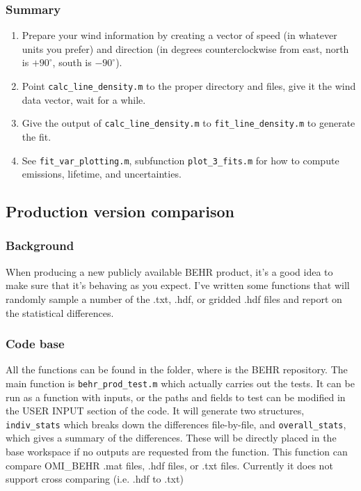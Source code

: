 \documentclass[12pt]{article}
\begin{document}
		\subsubsection{Summary}
		\begin{enumerate}
		\item Prepare your wind information by creating a vector of speed (in whatever units you prefer) and direction (in degrees counterclockwise from east, north is $+90^\circ$, south is $-90^\circ$).
		\item Point \lstinline$calc_line_density.m$ to the proper directory and files, give it the wind data vector, wait for a while.
		\item Give the output of \lstinline$calc_line_density.m$ to \lstinline$fit_line_density.m$ to generate the fit.
		\item See \lstinline$fit_var_plotting.m$, subfunction \lstinline$plot_3_fits.m$ for how to compute emissions, lifetime, and uncertainties.
		\end{enumerate}
		
		
	\subsection{Production version comparison}
		\subsubsection{Background}
		When producing a new publicly available BEHR product, it's a good idea to make sure that it's behaving as you expect. I've written some functions that will randomly sample a number of the .txt, .hdf, or gridded .hdf files and report on the statistical differences.
		
		\subsubsection{Code base} 
		All the functions can be found in the  folder, where  is the BEHR repository.  The main function is \lstinline$behr_prod_test.m$ which actually carries out the tests. It can be run as a function with inputs, or the paths and fields to test can be modified in the USER INPUT section of the code. It will generate two structures, \lstinline$indiv_stats$ which breaks down the differences file-by-file, and \lstinline$overall_stats$, which gives a summary of the differences. These will be directly placed in the base workspace if no outputs are requested from the function.  This function can compare OMI\_BEHR .mat files, .hdf files, or .txt files. Currently it does not support cross comparing (i.e. .hdf to .txt)
		
\end{document}
